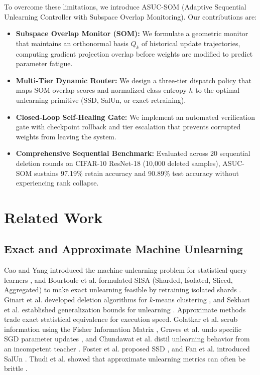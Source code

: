 \documentclass[conference]{IEEEtran}
\begin{document}
To overcome these limitations, we introduce ASUC-SOM (Adaptive Sequential Unlearning Controller with Subspace Overlap Monitoring). Our contributions are:
\begin{itemize}
    \item \textbf{Subspace Overlap Monitor (SOM):} We formulate a geometric monitor that maintains an orthonormal basis $Q_k$ of historical update trajectories, computing gradient projection overlap before weights are modified to predict parameter fatigue.
    \item \textbf{Multi-Tier Dynamic Router:} We design a three-tier dispatch policy that maps SOM overlap scores and normalized class entropy $h$ to the optimal unlearning primitive (SSD, SalUn, or exact retraining).
    \item \textbf{Closed-Loop Self-Healing Gate:} We implement an automated verification gate with checkpoint rollback and tier escalation that prevents corrupted weights from leaving the system.
    \item \textbf{Comprehensive Sequential Benchmark:} Evaluated across 20 sequential deletion rounds on CIFAR-10 ResNet-18 (10,000 deleted samples), ASUC-SOM sustains 97.19\% retain accuracy and 90.89\% test accuracy without experiencing rank collapse.
\end{itemize}

\section{Related Work}

\subsection{Exact and Approximate Machine Unlearning}
Cao and Yang introduced the machine unlearning problem for statistical-query learners \cite{b2}, and Bourtoule et al. formulated SISA (Sharded, Isolated, Sliced, Aggregated) to make exact unlearning feasible by retraining isolated shards \cite{b3}. Ginart et al. developed deletion algorithms for $k$-means clustering \cite{b14}, and Sekhari et al. established generalization bounds for unlearning \cite{b15}. Approximate methods trade exact statistical equivalence for execution speed. Golatkar et al. scrub information using the Fisher Information Matrix \cite{b7}, Graves et al. undo specific SGD parameter updates \cite{b13}, and Chundawat et al. distil unlearning behavior from an incompetent teacher \cite{b10}. Foster et al. proposed SSD \cite{b4}, and Fan et al. introduced SalUn \cite{b5}. Thudi et al. showed that approximate unlearning metrics can often be brittle \cite{b8}.
\end{document}
